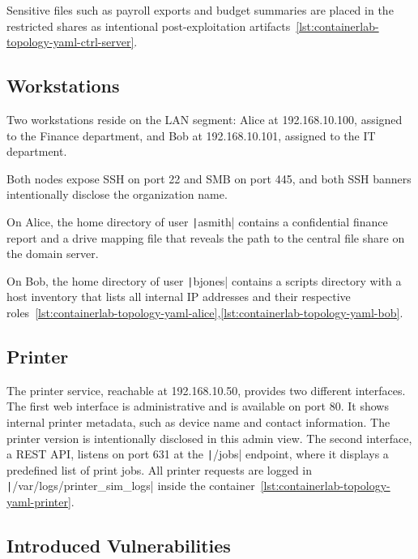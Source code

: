 Sensitive files such as payroll exports and budget summaries are placed in the restricted shares as intentional post-exploitation artifacts~\ref{lst:containerlab-topology-yaml-ctrl-server}.

\subsection{Workstations}\label{subsec:workstations}

Two workstations reside on the \gls{LAN} segment: Alice at 192.168.10.100, assigned to the Finance department, and Bob at 192.168.10.101, assigned to the IT department.

Both nodes expose \gls{SSH} on port 22 and \gls{SMB} on port 445, and both \gls{SSH} banners intentionally disclose the organization name.

On Alice, the home directory of user \texttt|asmith| contains a confidential finance report and a drive mapping file that reveals the path to the central file share on the domain server.

On Bob, the home directory of user \texttt|bjones| contains a scripts directory with a host inventory that lists all internal IP addresses and their respective roles~\ref{lst:containerlab-topology-yaml-alice},\ref{lst:containerlab-topology-yaml-bob}.

\subsection{Printer}\label{subsec:reproducible-test-environment-printer}

The printer service, reachable at 192.168.10.50, provides two different interfaces.
The first web interface is administrative and is available on port 80.
It shows internal printer metadata, such as device name and contact information.
The printer version is intentionally disclosed in this admin view.
The second interface, a \gls{REST API}, listens on port 631 at the \texttt|/jobs| endpoint, where it displays a predefined list of print jobs.
All printer requests are logged in \\ \texttt|{/var/logs/printer_sim_logs}| inside the container~\ref{lst:containerlab-topology-yaml-printer}.

\subsection{Introduced Vulnerabilities}\label{subsec:introduced-vulnerabilities}

